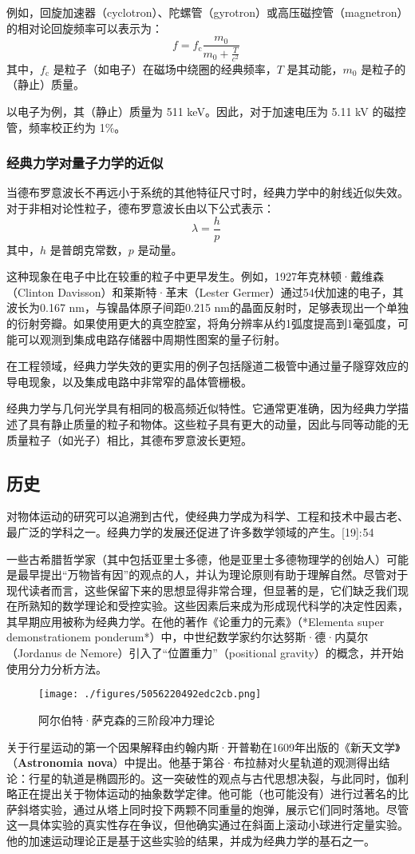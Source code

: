 例如，回旋加速器（cyclotron）、陀螺管（gyrotron）或高压磁控管（magnetron）的相对论回旋频率可以表示为：  
\[
f = f_{\mathrm{c}} \frac{m_0}{m_0 + \frac{T}{c^2}}~
\]  
其中，\( f_{\mathrm{c}} \) 是粒子（如电子）在磁场中绕圈的经典频率，\( T \) 是其动能，\( m_0 \) 是粒子的（静止）质量。  

以电子为例，其（静止）质量为 511 keV。因此，对于加速电压为 5.11 kV 的磁控管，频率校正约为 1\%。

\subsubsection{经典力学对量子力学的近似}  
当德布罗意波长不再远小于系统的其他特征尺寸时，经典力学中的射线近似失效。对于非相对论性粒子，德布罗意波长由以下公式表示：  
\[
\lambda = \frac{h}{p}~
\]  
其中，\( h \) 是普朗克常数，\( p \) 是动量。  

这种现象在电子中比在较重的粒子中更早发生。例如，1927年克林顿·戴维森（Clinton Davisson）和莱斯特·革末（Lester Germer）通过54伏加速的电子，其波长为0.167 nm，与镍晶体原子间距0.215 nm的晶面反射时，足够表现出一个单独的衍射旁瓣。如果使用更大的真空腔室，将角分辨率从约1弧度提高到1毫弧度，可能可以观测到集成电路存储器中周期性图案的量子衍射。  

在工程领域，经典力学失效的更实用的例子包括隧道二极管中通过量子隧穿效应的导电现象，以及集成电路中非常窄的晶体管栅极。  

经典力学与几何光学具有相同的极高频近似特性。它通常更准确，因为经典力学描述了具有静止质量的粒子和物体。这些粒子具有更大的动量，因此与同等动能的无质量粒子（如光子）相比，其德布罗意波长更短。

\subsection{历史}  
对物体运动的研究可以追溯到古代，使经典力学成为科学、工程和技术中最古老、最广泛的学科之一。经典力学的发展还促进了许多数学领域的产生。[19]: 54  

一些古希腊哲学家（其中包括亚里士多德，他是亚里士多德物理学的创始人）可能是最早提出“万物皆有因”的观点的人，并认为理论原则有助于理解自然。尽管对于现代读者而言，这些保留下来的思想显得非常合理，但显著的是，它们缺乏我们现在所熟知的数学理论和受控实验。这些因素后来成为形成现代科学的决定性因素，其早期应用被称为经典力学。在他的著作《论重力的元素》（*Elementa super demonstrationem ponderum*）中，中世纪数学家约尔达努斯·德·内莫尔（Jordanus de Nemore）引入了“位置重力”（positional gravity）的概念，并开始使用分力分析方法。
\begin{figure}[ht]
\centering
\texttt{[image: ./figures/5056220492edc2cb.png]}
\caption{阿尔伯特·萨克森的三阶段冲力理论} \label{fig_JDLX_4}
\end{figure}
关于行星运动的第一个因果解释由约翰内斯·开普勒在1609年出版的《新天文学》（\textbf{Astronomia nova}）中提出。他基于第谷·布拉赫对火星轨道的观测得出结论：行星的轨道是椭圆形的。这一突破性的观点与古代思想决裂，与此同时，伽利略正在提出关于物体运动的抽象数学定律。他可能（也可能没有）进行过著名的比萨斜塔实验，通过从塔上同时投下两颗不同重量的炮弹，展示它们同时落地。尽管这一具体实验的真实性存在争议，但他确实通过在斜面上滚动小球进行定量实验。他的加速运动理论正是基于这些实验的结果，并成为经典力学的基石之一。

